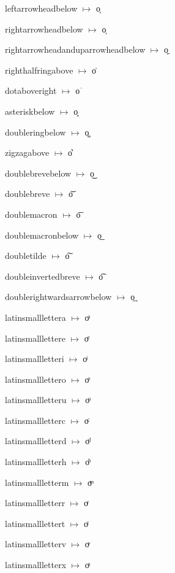 {\noindent leftarrowheadbelow $\mapsto$ {\cdmformat o͔}\par
\noindent rightarrowheadbelow $\mapsto$ {\cdmformat o͕}\par
\noindent rightarrowheadanduparrowheadbelow $\mapsto$ {\cdmformat o͖}\par
\noindent righthalfringabove $\mapsto$ {\cdmformat o͗}\par
\noindent dotaboveright $\mapsto$ {\cdmformat o͘}\par
\noindent asteriskbelow $\mapsto$ {\cdmformat o͙}\par
\noindent doubleringbelow $\mapsto$ {\cdmformat o͚}\par
\noindent zigzagabove $\mapsto$ {\cdmformat o͛}\par
\noindent doublebrevebelow $\mapsto$ {\cdmformat o͜}\par
\noindent doublebreve $\mapsto$ {\cdmformat o͝}\par
\noindent doublemacron $\mapsto$ {\cdmformat o͞}\par
\noindent doublemacronbelow $\mapsto$ {\cdmformat o͟}\par
\noindent doubletilde $\mapsto$ {\cdmformat o͠}\par
\noindent doubleinvertedbreve $\mapsto$ {\cdmformat o͡}\par
\noindent doublerightwardsarrowbelow $\mapsto$ {\cdmformat o͢}\par
\noindent latinsmalllettera $\mapsto$ {\cdmformat oͣ}\par
\noindent latinsmalllettere $\mapsto$ {\cdmformat oͤ}\par
\noindent latinsmallletteri $\mapsto$ {\cdmformat oͥ}\par
\noindent latinsmalllettero $\mapsto$ {\cdmformat oͦ}\par
\noindent latinsmallletteru $\mapsto$ {\cdmformat oͧ}\par
\noindent latinsmallletterc $\mapsto$ {\cdmformat oͨ}\par
\noindent latinsmallletterd $\mapsto$ {\cdmformat oͩ}\par
\noindent latinsmallletterh $\mapsto$ {\cdmformat oͪ}\par
\noindent latinsmallletterm $\mapsto$ {\cdmformat oͫ}\par
\noindent latinsmallletterr $\mapsto$ {\cdmformat oͬ}\par
\noindent latinsmalllettert $\mapsto$ {\cdmformat oͭ}\par
\noindent latinsmallletterv $\mapsto$ {\cdmformat oͮ}\par
\noindent latinsmallletterx $\mapsto$ {\cdmformat oͯ}\par
}

